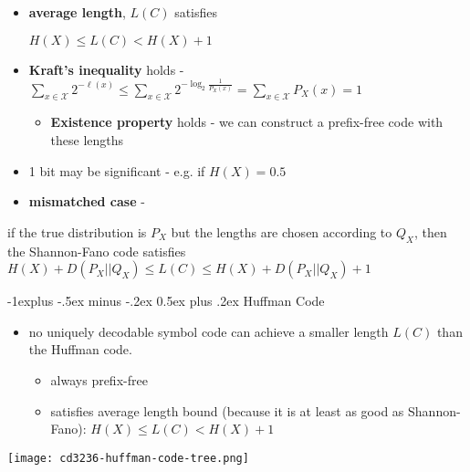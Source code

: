 \documentclass[10pt, landscape]{article}
\makeatletter
\renewcommand{\subsection}{\@startsection{subsection}{2}{0mm}%
  {-1explus -.5ex minus -.2ex}%
  {0.5ex plus .2ex}%
{\normalfont\normalsize\bfseries}}
\makeatother
\begin{document}
\begin{multicols*}{4}
  \begin{itemize}
    \item \textbf{average length}, $L(C)$ satisfies
      \begin{tightcenter}
        $H(X) \leq L(C) < H(X) + 1$
      \end{tightcenter}
    \item \textbf{Kraft's inequality} holds - 
      \( {\displaystyle{ \sum_{x \in \mathcal{X}} 2^{-\ell (x)} 
      \leq \sum_{x \in \mathcal{X}} 2^{-\log_2 \frac{1}{P_X(x)} } = \sum_{x \in \mathcal{X}} P_X(x) = 1 }} \) 
      \begin{itemize}
        \item \textbf{Existence property} holds - we can construct a prefix-free code with these lengths 
      \end{itemize}
    \item 1 bit may be significant - e.g. if $H(X)=0.5$
    \item \textbf{mismatched case} - 
  \end{itemize}
  \begin{tightcenter}
    if the true distribution is $P_X$ but the lengths are chosen according to $Q_X$, 
    then the Shannon-Fano code satisfies
    $H(X) + D(P_X \vert \vert Q_X) \leq L(C) \leq H(X) + D(P_X \vert \vert Q_X) + 1$
  \end{tightcenter}


  \subsection{Huffman Code}

  \begin{itemize}
    \item no uniquely decodable symbol code can achieve a smaller length $L(C)$ than the Huffman code.
      \begin{itemize}
        \item always prefix-free
        \item satisfies average length bound (because it is at least as good as Shannon-Fano):
          $H(X) \leq L(C) < H(X) + 1$
      \end{itemize}
  \end{itemize}

  \begin{tightcenter}
    \texttt{[image: cd3236-huffman-code-tree.png]} 
  \end{tightcenter}


\end{multicols*}
\end{document}
